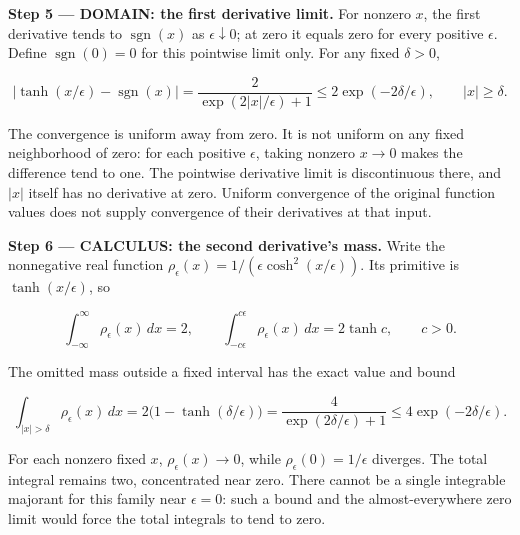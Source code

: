 \documentclass[11pt,oneside,openany]{book}
\begin{document}
\begin{DomainStep}
\textbf{Step 5 --- DOMAIN: the first derivative limit.} For nonzero \(x\), the first derivative tends to \(\operatorname{sgn}(x)\) as \(\epsilon\downarrow0\); at zero it equals zero for every positive \(\epsilon\). Define \(\operatorname{sgn}(0)=0\) for this pointwise limit only. For any fixed \(\delta>0\),

\[
\left|\tanh(x/\epsilon)-\operatorname{sgn}(x)\right|
=\frac2{\exp(2|x|/\epsilon)+1}
\le2\exp(-2\delta/\epsilon),\qquad |x|\ge\delta.
\]

The convergence is uniform away from zero. It is not uniform on any fixed neighborhood of zero: for each positive \(\epsilon\), taking nonzero \(x\to0\) makes the difference tend to one. The pointwise derivative limit is discontinuous there, and \(|x|\) itself has no derivative at zero. Uniform convergence of the original function values does not supply convergence of their derivatives at that input.

\end{DomainStep}
\textbf{Step 6 --- CALCULUS: the second derivative's mass.} Write the nonnegative real function \(\rho_\epsilon(x)=1/(\epsilon\cosh^2(x/\epsilon))\). Its primitive is \(\tanh(x/\epsilon)\), so

\[
\int_{-\infty}^{\infty}\rho_\epsilon(x)\,dx=2,
\qquad
\int_{-c\epsilon}^{c\epsilon}\rho_\epsilon(x)\,dx=2\tanh c,\qquad c>0.
\]

The omitted mass outside a fixed interval has the exact value and bound

\[
\int_{|x|>\delta}\rho_\epsilon(x)\,dx
=2\bigl(1-\tanh(\delta/\epsilon)\bigr)
=\frac4{\exp(2\delta/\epsilon)+1}
\le4\exp(-2\delta/\epsilon).
\]

For each nonzero fixed \(x\), \(\rho_\epsilon(x)\to0\), while \(\rho_\epsilon(0)=1/\epsilon\) diverges. The total integral remains two, concentrated near zero. There cannot be a single integrable majorant for this family near \(\epsilon=0\): such a bound and the almost-everywhere zero limit would force the total integrals to tend to zero.
\end{document}
